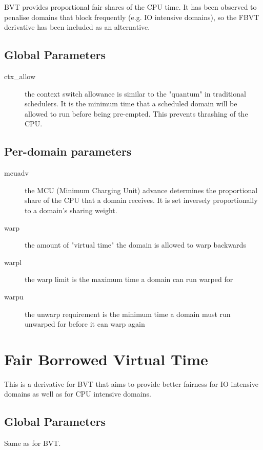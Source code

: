 \documentclass[11pt,twoside,final,openright]{xenstyle}
\begin{document}
{BVT provides proportional fair shares of the CPU time.  It has been
observed to penalise domains that block frequently (e.g. IO intensive
domains), so the FBVT derivative has been included as an alternative.

\subsection{Global Parameters}

\begin{description}
\item[ctx\_allow]
  the context switch allowance is similar to the "quantum"
  in traditional schedulers.  It is the minimum time that
  a scheduled domain will be allowed to run before being
  pre-empted.  This prevents thrashing of the CPU.
\end{description}

\subsection{Per-domain parameters}

\begin{description}
\item[mcuadv]
  the MCU (Minimum Charging Unit) advance determines the
  proportional share of the CPU that a domain receives.  It
  is set inversely proportionally to a domain's sharing weight.
\item[warp]
  the amount of "virtual time" the domain is allowed to warp
  backwards
\item[warpl]
  the warp limit is the maximum time a domain can run warped for
\item[warpu]
  the unwarp requirement is the minimum time a domain must
  run unwarped for before it can warp again
\end{description}

\section{Fair Borrowed Virtual Time}

This is a derivative for BVT that aims to provide better fairness for
IO intensive domains as well as for CPU intensive domains.

\subsection{Global Parameters}

Same as for BVT.

}
\end{document}
